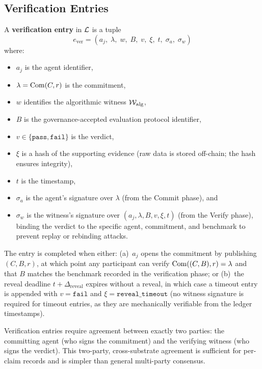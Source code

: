 \subsection{Verification Entries}
\label{sec:ver_entries}

\begin{definition}
\label{def:ver_entry}
A \textbf{verification entry} in $\mathcal{L}$ is a tuple
\[
    e_{\mathrm{ver}} = (a_j,\; \lambda,\; w,\; B,\; v,\; \xi,\;
    t,\; \sigma_a,\; \sigma_w)
\]
where:
\begin{itemize}
    \item $a_j$ is the agent identifier,
    \item $\lambda = \mathrm{Com}(C, r)$ is the commitment,
    \item $w$ identifies the algorithmic witness
    $\mathcal{W}_{\mathrm{alg}}$,
    \item $B$ is the governance-accepted evaluation protocol identifier,
    \item $v \in \{\texttt{pass}, \texttt{fail}\}$ is the verdict,
    \item $\xi$ is a hash of the supporting evidence (raw data is
    stored off-chain; the hash ensures integrity),
    \item $t$ is the timestamp,
    \item $\sigma_a$ is the agent's signature over $\lambda$ (from the
    Commit phase), and
    \item $\sigma_w$ is the witness's signature over
    $(a_j, \lambda, B, v, \xi, t)$
    (from the Verify phase), binding the verdict to the specific
    agent, commitment, and benchmark to prevent replay or rebinding
    attacks.
\end{itemize}
The entry is completed when either: (a)~$a_j$ opens the commitment by
publishing $(C, B, r)$, at which point any participant can verify
$\mathrm{Com}((C, B), r) = \lambda$ and that $B$ matches the benchmark
recorded in the verification phase; or (b)~the reveal deadline
$t + \Delta_{\mathrm{reveal}}$ expires without a reveal, in which
case a timeout entry is appended with $v = \texttt{fail}$ and
$\xi = \texttt{reveal\_timeout}$ (no witness signature is required
for timeout entries, as they are mechanically verifiable from the
ledger timestamps).
\end{definition}

Verification entries require agreement between exactly two parties: the
committing agent (who signs the commitment) and the verifying witness
(who signs the verdict).  This two-party, cross-substrate agreement is
sufficient for per-claim records and is simpler than general
multi-party consensus.

